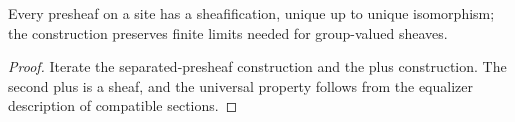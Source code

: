 \begin{theorem}\label{fga-thm-2-64}
Every presheaf on a site has a sheafification, unique up to unique isomorphism;
the construction preserves finite limits needed for group-valued sheaves.
\end{theorem}
\begin{proof}
Iterate the separated-presheaf construction and the plus construction.  The
second plus is a sheaf, and the universal property follows from the equalizer
description of compatible sections.
\end{proof}

